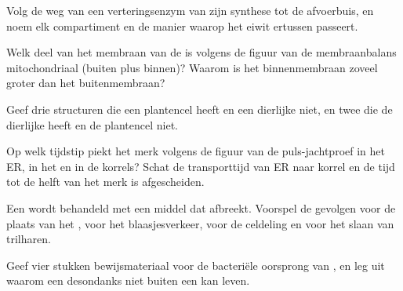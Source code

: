\begin{exercise}[$\star$]\label{exo:b1:eukaryotic-cell:2}
Volg de weg van een verteringsenzym van zijn synthese tot de afvoerbuis, en noem
elk compartiment en de manier waarop het eiwit ertussen passeert.
\end{exercise}

\begin{exercise}[$\star$]\label{exo:b1:eukaryotic-cell:3}
Welk deel van het membraan van de  is volgens de figuur van de membraanbalans
mitochondriaal (buiten plus binnen)? Waarom is het binnenmembraan zoveel groter
dan het buitenmembraan?
\end{exercise}

\begin{exercise}[$\star$]\label{exo:b1:eukaryotic-cell:4}
Geef drie structuren die een plantencel heeft en een dierlijke  niet, en twee
die de dierlijke  heeft en de plantencel niet.
\end{exercise}

\begin{exercise}[$\star\star$]\label{exo:b1:eukaryotic-cell:5}
Op welk tijdstip piekt het merk volgens de figuur van de puls-jachtproef in het
ER, in het  en in de korrels? Schat de transporttijd van ER naar
korrel en de tijd tot de helft van het merk is afgescheiden.
\end{exercise}

\begin{exercise}[$\star\star$]\label{exo:b1:eukaryotic-cell:6}
Een  wordt behandeld met een middel dat  afbreekt. Voorspel de
gevolgen voor de plaats van het , voor het blaasjesverkeer, voor
de celdeling en voor het slaan van trilharen.
\end{exercise}

\begin{exercise}[$\star\star$]\label{exo:b1:eukaryotic-cell:7}
Geef vier stukken bewijsmateriaal voor de bacteriële oorsprong van ,
en leg uit waarom een  desondanks niet buiten een  kan leven.
\end{exercise}

